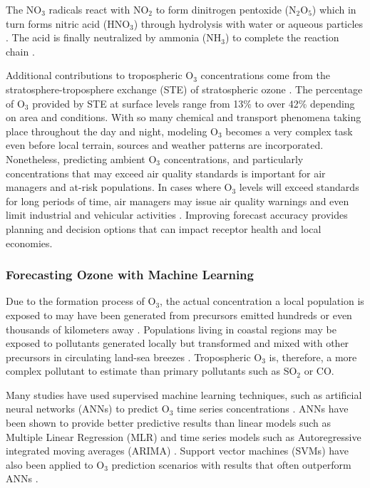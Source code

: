 The NO$_{3}$ radicals react with NO$_{2}$ to form dinitrogen pentoxide (N$_{2}$O$_{5}$) which in turn forms nitric acid (HNO$_{3}$) through hydrolysis with water or aqueous particles \citep{Song2011}. The acid is finally neutralized by ammonia (NH$_{3}$) to complete the reaction chain \citep{Brown2012}.

Additional contributions to tropospheric O$_{3}$ concentrations come from the stratosphere-troposphere exchange (STE) of stratospheric ozone \citep{Tarasick2008}. The percentage of O$_{3}$ provided by STE at surface levels range from 13\% \citep{Cooper2006} to over 42\% \citep{Lelieveld2000} depending on area and conditions. With so many chemical and transport phenomena taking place throughout the day and night, modeling O$_{3}$ becomes a very complex task even before local terrain, sources and weather patterns are incorporated. Nonetheless, predicting ambient O$_{3}$ concentrations, and particularly concentrations that may exceed air quality standards is important for air managers and at-risk populations.  In cases where O$_{3}$ levels will exceed standards for long periods of time, air managers may issue air quality warnings and even limit industrial and vehicular activities \citep{Kuhlbusch2014, Welch2005}. Improving forecast accuracy provides planning and decision options that can impact receptor health and local economies.

\subsubsection{Forecasting Ozone with Machine Learning}

Due to the formation process of O$_{3}$, the actual concentration a local population is exposed to may have been generated from precursors emitted hundreds or even thousands of kilometers away \citep{Glavas2011}. Populations living in coastal regions may be exposed to pollutants generated locally but transformed and mixed with other precursors in circulating land-sea breezes \citep{Freeman2017a}. Tropospheric O$_{3}$ is, therefore, a more complex pollutant to estimate than primary pollutants such as SO$_{2}$ or CO.

Many studies have used supervised machine learning techniques, such as artificial neural networks (ANNs) to predict O$_{3}$ time series concentrations \citep{Comrie1997, Dorling2003, Ettouney2009a, Kurt2008, Biancofiore2017}. ANNs have been shown to provide better predictive results than linear models such as Multiple Linear Regression (MLR) and time series models such as Autoregressive integrated moving averages (ARIMA) \citep{Gardner1998, Prybutok2000}. Support vector machines (SVMs) have also been applied to O$_{3}$ prediction scenarios with results that often outperform ANNs \citep{Luna2014, Papaleonidas2013, Singh2013}. 

